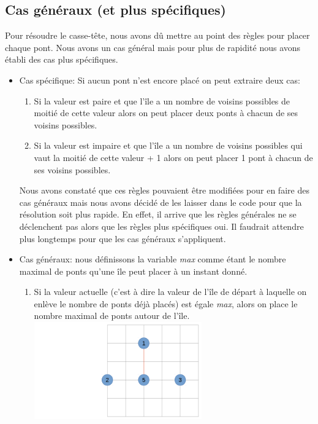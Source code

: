 \documentclass[french]{article}
\begin{document}
    \subsection{\Large Cas généraux (et plus spécifiques)}
    \hspace{0.5cm} Pour résoudre le casse-tête, nous avons dû mettre au point des règles pour placer chaque pont. Nous avons un cas général mais pour plus de rapidité nous avons établi des cas plus spécifiques.
    \begin{itemize}
    \item Cas spécifique: Si aucun pont n'est encore placé on peut extraire deux cas: 
        \begin{enumerate}
             \item Si la valeur est paire et que l'île a un nombre de voisins possibles de moitié de cette valeur alors on peut placer deux ponts à chacun de ses voisins possibles.
            \item Si la valeur est impaire et que l'île a un nombre de voisins possibles qui vaut la moitié de cette valeur + 1 alors on peut placer 1 pont à chacun de ses voisins possibles.
        \end{enumerate}     
        \newline
    Nous avons constaté que ces règles pouvaient être modifiées pour en faire des cas généraux mais nous avons décidé de les laisser dans le code pour que la résolution soit plus rapide. En effet, il arrive que les règles générales ne se déclenchent pas alors que les règles plus spécifiques oui. Il faudrait attendre plus longtemps pour que les cas généraux s'appliquent.\\
    \item Cas généraux: nous définissons la variable \textit{max} comme étant le nombre maximal de ponts qu'une île peut placer à un instant donné.
        \begin{enumerate}
            \item Si la valeur actuelle (c'est à dire la valeur de l'île de départ à laquelle on enlève le nombre de ponts déjà placés) est égale \textit{max}, alors on place le nombre maximal de ponts autour de l'île.\\
            \newline
            {\centering \includegraphics[width=0.6\textwidth]{Cas3a.png}}

\end{enumerate}
\end{itemize}
\end{document}
